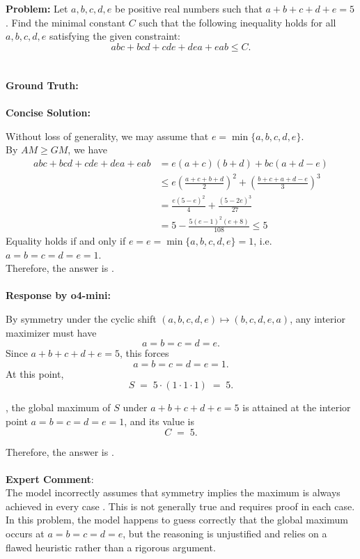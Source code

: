 \begin{examplebox}
\textbf{Problem:} Let $a, b, c, d, e$ be positive real numbers such that $a+b+c+d+e=5$. Find the minimal constant $C$ such that the following inequality holds for all $a, b, c, d, e$ satisfying the given constraint:
$$
a b c + b c d + c d e + d e a + e a b \leq C.
$$
\\\\
\textbf{Ground Truth:} 
\\\\
\textbf{Concise Solution:} 

Without loss of generality, we may assume that $e=\min \{a, b, c, d, e\}$.\\
By $A M \geq G M$, we have
$$\begin{aligned}a b c+b c d+c d e+d e a+e a b & =e(a+c)(b+d)+b c(a+d-e) \\
& \leq e\left(\frac{a+c+b+d}{2}\right)^{2}+\left(\frac{b+c+a+d-e}{3}\right)^{3} \\
& =\frac{e(5-e)^{2}}{4}+\frac{(5-2 e)^{3}}{27}\\
&= 5-\frac{5(e-1)^{2}(e+8)}{108}\leq 5\end{aligned}$$
Equality holds if and only if $e=e=\min \{a, b, c, d, e\}=1$,  i.e. $a=b=c=d=e=1$.\\
Therefore, the answer is .
\\\\
\textbf{Response by o4-mini:}

By symmetry under the cyclic shift \((a,b,c,d,e)\mapsto(b,c,d,e,a)\), any interior maximizer must have
\[
a=b=c=d=e.
\]
Since \(a+b+c+d+e=5\), this forces
\[
a=b=c=d=e=1.
\]
At this point,
\[
S \;=\;5\cdot(1\cdot1\cdot1)\;=\;5.
\]

, the global maximum of \(S\) under \(a+b+c+d+e=5\) is attained at the interior point \(a=b=c=d=e=1\), and its value is
\[
C \;=\;5.
\]

Therefore, the answer is .
\\\\
\textbf{Expert Comment}: \\
The model incorrectly assumes that symmetry implies the maximum is always achieved in every case \wronghl. This is not generally true and requires proof in each case. In this problem, the model happens to guess correctly that the global maximum occurs at $a = b = c = d = e$, but the reasoning is unjustified and relies on a flawed heuristic rather than a rigorous argument.

\end{examplebox}





